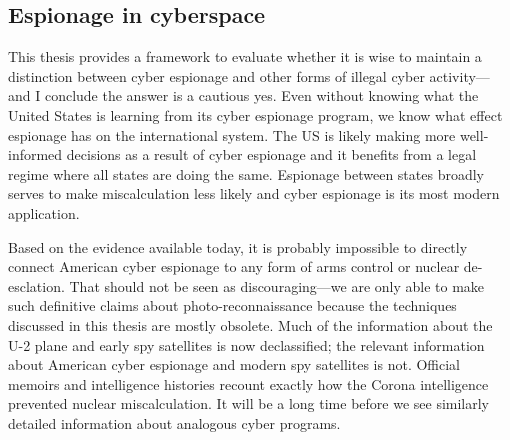 \documentclass[11pt]{memoir}
\begin{document}

\subsection{Espionage in cyberspace}
This thesis provides a framework to evaluate whether it is wise to maintain a distinction between cyber espionage and other forms of illegal cyber activity---and I conclude the answer is a cautious yes. Even without knowing what the United States is learning from its cyber espionage program, we know what effect espionage has on the international system. The US is likely making more well-informed decisions as a result of cyber espionage and it benefits from a legal regime where all states are doing the same. Espionage between states broadly serves to make miscalculation less likely and cyber espionage is its most modern application.

Based on the evidence available today, it is probably impossible to directly connect American cyber espionage to any form of arms control or nuclear de-esclation. That should not be seen as discouraging---we are only able to make such definitive claims about photo-reconnaissance because the techniques discussed in this thesis are mostly obsolete. Much of the information about the U-2 plane and early spy satellites is now declassified; the relevant information about American cyber espionage and modern spy satellites is not. Official memoirs and intelligence histories recount exactly how the Corona intelligence prevented nuclear miscalculation. It will be a long time before we see similarly detailed information about analogous cyber programs.
\end{document}
